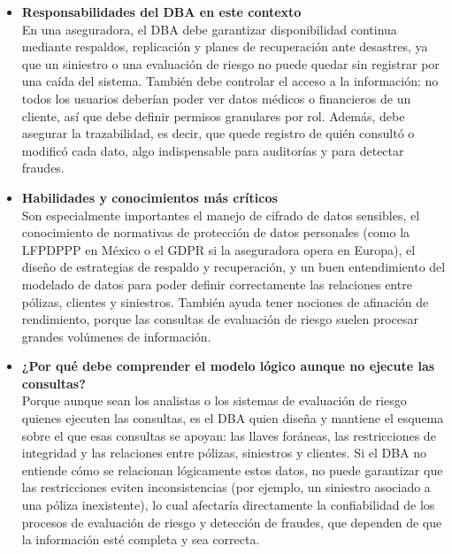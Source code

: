 \begin{itemize}
	\item \textbf{Responsabilidades del DBA en este contexto}\\
	      En una aseguradora, el DBA debe garantizar disponibilidad continua mediante respaldos, replicación y planes de recuperación ante desastres, ya que un siniestro o una evaluación de riesgo no puede quedar sin registrar por una caída del sistema. También debe controlar el acceso a la información: no todos los usuarios deberían poder ver datos médicos o financieros de un cliente, así que debe definir permisos granulares por rol. Además, debe asegurar la trazabilidad, es decir, que quede registro de quién consultó o modificó cada dato, algo indispensable para auditorías y para detectar fraudes.
 
	\item \textbf{Habilidades y conocimientos más críticos}\\
	      Son especialmente importantes el manejo de cifrado de datos sensibles, el conocimiento de normativas de protección de datos personales (como la LFPDPPP en México o el GDPR si la aseguradora opera en Europa), el diseño de estrategias de respaldo y recuperación, y un buen entendimiento del modelado de datos para poder definir correctamente las relaciones entre pólizas, clientes y siniestros. También ayuda tener nociones de afinación de rendimiento, porque las consultas de evaluación de riesgo suelen procesar grandes volúmenes de información.
 
	\item \textbf{¿Por qué debe comprender el modelo lógico aunque no ejecute las consultas?}\\
	      Porque aunque sean los analistas o los sistemas de evaluación de riesgo quienes ejecuten las consultas, es el DBA quien diseña y mantiene el esquema sobre el que esas consultas se apoyan: las llaves foráneas, las restricciones de integridad y las relaciones entre pólizas, siniestros y clientes. Si el DBA no entiende cómo se relacionan lógicamente estos datos, no puede garantizar que las restricciones eviten inconsistencias (por ejemplo, un siniestro asociado a una póliza inexistente), lo cual afectaría directamente la confiabilidad de los procesos de evaluación de riesgo y detección de fraudes, que dependen de que la información esté completa y sea correcta.
\end{itemize}
